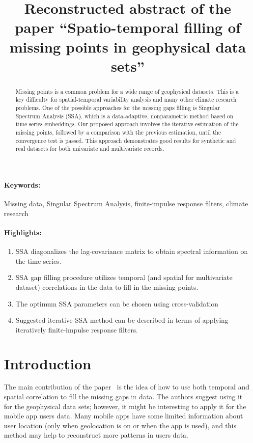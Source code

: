 \documentclass[12pt]{article}
\title{Reconstructed abstract of the paper ``Spatio-temporal filling of missing points in geophysical data sets''}
\date{}
\begin{document}
\maketitle

\begin{abstract}
Missing points is a common problem for a wide range of geophysical datasets. This is a key difficulty for spatial-temporal variability analysis and many other climate research problems. One of the possible approaches for the missing gaps filling is Singular Spectrum Analysis (SSA), which is a data-adaptive, nonparametric method based on time series embeddings. Our proposed approach involves the iterative estimation of the missing points, followed by a comparison with the previous estimation, until the convergence test is passed. This approach demonstrates good results for synthetic and real datasets for both univariate and multivariate records.
\end{abstract}
\paragraph{Keywords:} Missing data, Singular Spectrum Analysis, finite-impulse response filters, climate research

\paragraph{Highlights:}
\begin{enumerate}
\item SSA diagonalizes the lag-covariance matrix to obtain spectral information on the time series.
\item SSA gap filling procedure utilizes temporal (and spatial for multivariate dataset) correlations in the data to fill in the missing points.
\item The optimum SSA parameters can be chosen using cross-validation
\item Suggested iterative SSA method can be described in terms of applying iteratively finite-impulse response filters.
\end{enumerate}

\section{Introduction}
The main contribution of the paper~\cite{npg-13-151-2006} is the idea of how to use both temporal and spatial correlation to fill the missing gaps in data. The authors suggest using it for the geophysical data sets; however, it might be interesting to apply it for the mobile app users data. Many mobile apps have some limited information about user location (only when geolocation is on or when the app is used), and this method may help to reconstruct more patterns in users data.



\end{document}
